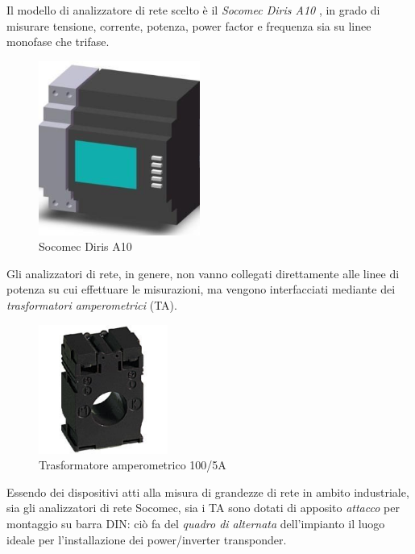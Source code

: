 %
Il modello di analizzatore di rete scelto \`e il \emph{Socomec Diris A10}
\cite{dirisa10}, in grado di misurare tensione, corrente, potenza, power factor 
e frequenza sia su linee monofase che trifase.
%
\begin{figure}[!h]
\centering
\includegraphics[width=150pt]{img/power-transponder.jpg}
\caption{Socomec Diris A10}
\label{power-transpoder}
\end{figure}
%

%
Gli analizzatori di rete, in genere, non vanno collegati direttamente alle linee di 
potenza su cui effettuare le misurazioni, ma vengono interfacciati mediante dei 
\emph{trasformatori amperometrici} (TA).
%
\begin{figure}[!h]
\centering
\includegraphics[width=120pt]{img/ta.jpg}
\caption{Trasformatore amperometrico 100/5A}
\label{ta}
\end{figure}
%

%
Essendo dei dispositivi atti alla misura di grandezze di rete in ambito industriale, 
sia gli analizzatori di rete Socomec, sia i TA sono dotati di apposito \emph{attacco} 
per montaggio su barra DIN: ci\`o fa del \emph{quadro di alternata} dell'impianto 
il luogo ideale per l'installazione dei power/inverter transponder.
%

%
